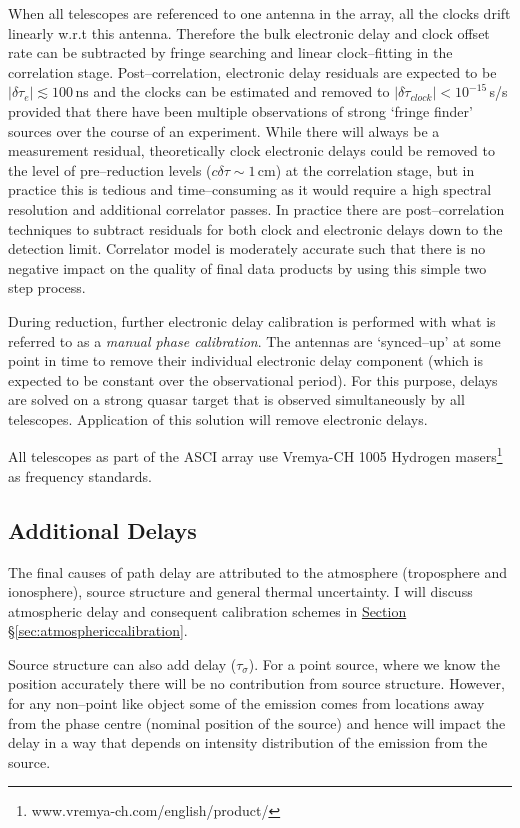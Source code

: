 		When all telescopes are referenced to one antenna in the array, all the clocks drift linearly w.r.t this antenna. Therefore the bulk electronic delay and clock offset rate can be subtracted by fringe searching and linear clock--fitting in the correlation stage. Post--correlation, electronic delay residuals are expected to be $|\delta\tau_e|\lesssim100$\,ns and the clocks can be estimated and removed to $|\delta\dot{\tau}_{clock}|<10^{-15}$\,s/s provided that there have been multiple observations of strong `fringe finder' sources over the course of an experiment. While there will always be a measurement residual, theoretically clock electronic delays could be removed to the level of pre--reduction levels ($c\delta\tau\sim1$\,cm) at the correlation stage, but in practice this is tedious and time--consuming as it would require a high spectral resolution and additional correlator passes. In practice there are post--correlation techniques to subtract residuals for both clock and electronic delays down to the detection limit. Correlator model is moderately accurate such that there is no negative impact on the quality of final data products by using this simple two step process.
		
		During reduction, further electronic delay calibration is performed with what is referred to as a \textit{manual phase calibration}. The antennas are `synced--up' at some point in time to remove their individual electronic delay component (which is expected to be constant over the observational period). For this purpose, delays are solved on a strong quasar target that is observed simultaneously by all telescopes. Application of this solution will remove electronic delays.
		
		All telescopes as part of the ASCI array use Vremya-CH 1005 Hydrogen masers\footnote{www.vremya-ch.com/english/product/} as frequency standards.
	
	\subsection{Additional Delays}
		The final causes of path delay are attributed to the atmosphere (troposphere and ionosphere), source structure and general thermal uncertainty. I will discuss atmospheric delay and consequent calibration schemes in \hyperref[sec:atmosphericcalibration]{Section \S \ref*{sec:atmosphericcalibration}}.
		
		Source structure can also add delay ($\tau_\sigma$). For a point source, where we know the position accurately there will be no contribution from source structure. However, for any non--point like object some of the emission comes from locations away from the phase centre (nominal position of the source) and hence will impact the delay in a way that depends on intensity distribution of the emission from the source.
		
